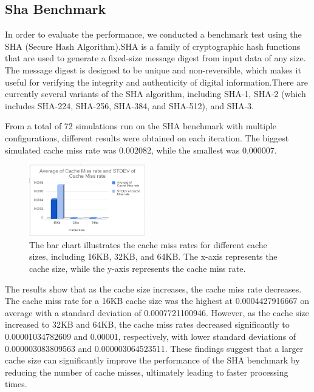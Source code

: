 \documentclass[conference]{IEEEtran}
\begin{document}
\subsection{Sha Benchmark}
In order to evaluate the performance, we conducted a benchmark test using the SHA (Secure Hash Algorithm).SHA is a family of cryptographic hash functions that are used to generate a fixed-size message digest from input data of any size. The message digest is designed to be unique and non-reversible, which makes it useful for verifying the integrity and authenticity of digital information.There are currently several variants of the SHA algorithm, including SHA-1, SHA-2 (which includes SHA-224, SHA-256, SHA-384, and SHA-512), and SHA-3.

From a total of 72 simulations run on the SHA benchmark with multiple configurations, different results were obtained on each iteration. The biggest simulated cache miss rate was 0.002082, while the smallest was 0.000007.

\begin{figure}[H]
    \centering
    \includegraphics[width=0.45\textwidth]{sha/sha_avg_cachesize.png}
    \caption{The bar chart illustrates the cache miss rates for different cache sizes, including 16KB, 32KB, and 64KB. The x-axis represents the cache size, while the y-axis represents the cache miss rate.}
\end{figure}

The results show that as the cache size increases, the cache miss rate decreases. The cache miss rate for a 16KB cache size was the highest at 0.0004427916667 on average with a standard deviation of 0.0007721100946. However, as the cache size increased to 32KB and 64KB, the cache miss rates decreased significantly to 0.00001034782609 and 0.00001, respectively, with lower standard deviations of 0.000003083809563 and 0.000003064523511. These findings suggest that a larger cache size can significantly improve the performance of the SHA benchmark by reducing the number of cache misses, ultimately leading to faster processing times.

\space
\end{document}

